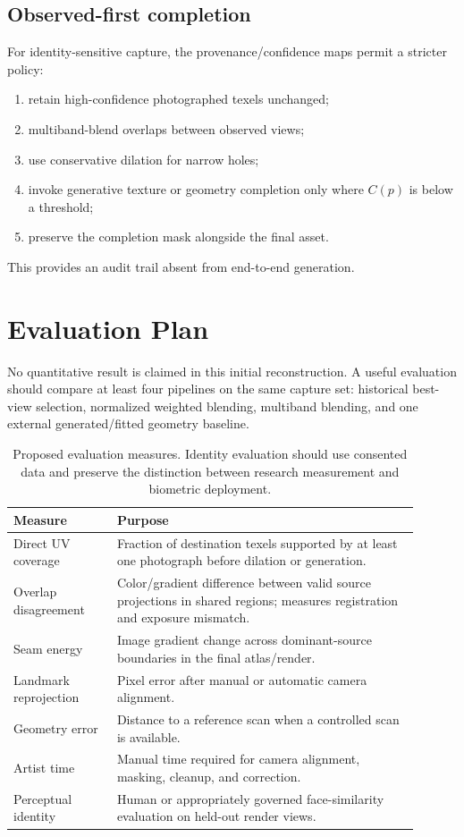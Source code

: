 \documentclass[10pt]{article}
\begin{document}
\subsection{Observed-first completion}
For identity-sensitive capture, the provenance/confidence maps permit a stricter policy:
\begin{enumerate}[leftmargin=1.5em,itemsep=1pt]
    \item retain high-confidence photographed texels unchanged;
    \item multiband-blend overlaps between observed views;
    \item use conservative dilation for narrow holes;
    \item invoke generative texture or geometry completion only where $C(p)$ is below a threshold;
    \item preserve the completion mask alongside the final asset.
\end{enumerate}
This provides an audit trail absent from end-to-end generation.

\section{Evaluation Plan}
No quantitative result is claimed in this initial reconstruction. A useful evaluation should compare at least four pipelines on the same capture set: historical best-view selection, normalized weighted blending, multiband blending, and one external generated/fitted geometry baseline.

\begin{table}[h]
\centering
\small
\begin{tabular}{p{0.23\linewidth}p{0.67\linewidth}}
\toprule
\textbf{Measure} & \textbf{Purpose} \\
\midrule
Direct UV coverage & Fraction of destination texels supported by at least one photograph before dilation or generation. \\
Overlap disagreement & Color/gradient difference between valid source projections in shared regions; measures registration and exposure mismatch. \\
Seam energy & Image gradient change across dominant-source boundaries in the final atlas/render. \\
Landmark reprojection & Pixel error after manual or automatic camera alignment. \\
Geometry error & Distance to a reference scan when a controlled scan is available. \\
Artist time & Manual time required for camera alignment, masking, cleanup, and correction. \\
Perceptual identity & Human or appropriately governed face-similarity evaluation on held-out render views. \\
\bottomrule
\end{tabular}
\caption{Proposed evaluation measures. Identity evaluation should use consented data and preserve the distinction between research measurement and biometric deployment.}
\end{table}
\end{document}
